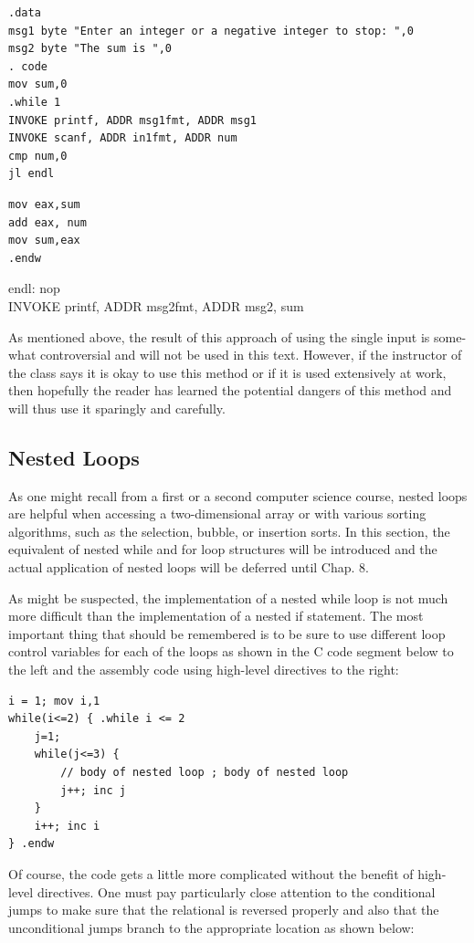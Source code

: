 \documentclass[10pt]{book}
\begin{document}
\begin{verbatim}
.data
msg1 byte "Enter an integer or a negative integer to stop: ",0
msg2 byte "The sum is ",0
. code
mov sum,0
.while 1
INVOKE printf, ADDR msg1fmt, ADDR msg1
INVOKE scanf, ADDR in1fmt, ADDR num
cmp num,0
jl endl
\end{verbatim}

\begin{verbatim}
mov eax,sum
add eax, num
mov sum,eax
.endw
\end{verbatim}

endl: nop\\
INVOKE printf, ADDR msg2fmt, ADDR msg2, sum

As mentioned above, the result of this approach of using the single input is some-what controversial and will not be used in this text. However, if the instructor of the class says it is okay to use this method or if it is used extensively at work, then hopefully the reader has learned the potential dangers of this method and will thus use it sparingly and carefully.

\subsection{Nested Loops}
As one might recall from a first or a second computer science course, nested loops are helpful when accessing a two-dimensional array or with various sorting algorithms, such as the selection, bubble, or insertion sorts. In this section, the equivalent of nested while and for loop structures will be introduced and the actual application of nested loops will be deferred until Chap. 8.

As might be suspected, the implementation of a nested while loop is not much more difficult than the implementation of a nested if statement. The most important thing that should be remembered is to be sure to use different loop control variables for each of the loops as shown in the C code segment below to the left and the assembly code using high-level directives to the right:

\begin{verbatim}
i = 1; mov i,1
while(i<=2) { .while i <= 2
    j=1;
    while(j<=3) {
        // body of nested loop ; body of nested loop
        j++; inc j
    }
    i++; inc i
} .endw
\end{verbatim}

Of course, the code gets a little more complicated without the benefit of high-level directives. One must pay particularly close attention to the conditional jumps to make sure that the relational is reversed properly and also that the unconditional jumps branch to the appropriate location as shown below:
\end{document}
